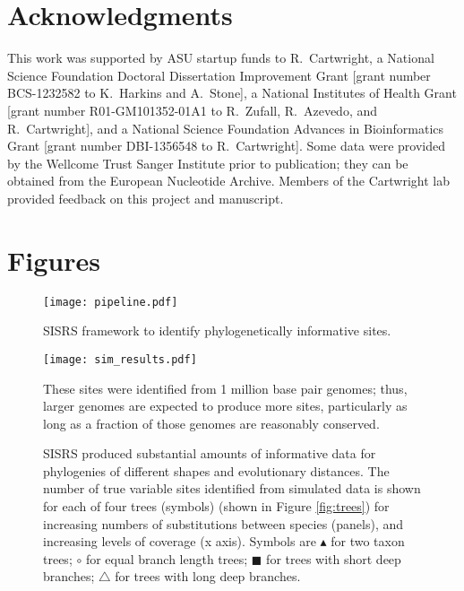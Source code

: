 \documentclass[11pt, oneside]{article}   	%
\begin{document}
\section{Acknowledgments}

This work was supported by ASU startup funds to R.\ Cartwright, a National Science Foundation Doctoral Dissertation Improvement Grant [grant number BCS-1232582 to K.\ Harkins and A.\ Stone], a National Institutes of Health Grant [grant number R01-GM101352-01A1 to R.\ Zufall, R.\ Azevedo, and R.\ Cartwright], and a National Science Foundation Advances in Bioinformatics Grant [grant number DBI-1356548 to R.\ Cartwright]. 
Some data were provided by the Wellcome Trust Sanger Institute prior to publication; they can be obtained from the European Nucleotide Archive.
Members of the Cartwright lab provided feedback on this project and manuscript.  



\newpage
\newpage
\onecolumn
\section{Figures}

\begin{figure}[!ht]
\texttt{[image: pipeline.pdf]}
\caption{SISRS framework to identify phylogenetically informative sites.}
\label{fig:pipeline}
\end{figure}

\begin{figure}[!ht]
\texttt{[image: sim\_results.pdf]}
\caption{SISRS produced substantial amounts of informative data for phylogenies of different shapes and evolutionary distances. 
The number of true variable sites identified from simulated data is shown for each of four trees (symbols) (shown in Figure \ref{fig:trees}) for increasing numbers of substitutions between species (panels), and increasing levels of coverage (x axis). Symbols are %
$\blacktriangle$ for two taxon trees; $\circ$ for equal branch length trees; $\blacksquare$ for trees with short deep branches; $\triangle$ for trees with long deep branches.}
These sites were identified from 1 million base pair genomes; thus, larger genomes are expected to produce more sites, particularly as long as a fraction of those genomes are reasonably conserved.
\label{fig:simresults}
\end{figure}
\end{document}
